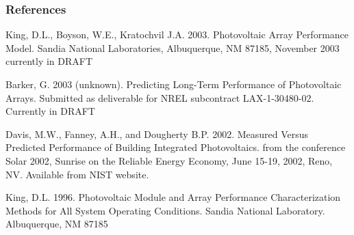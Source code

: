 \subsubsection{References}\label{references-1-014}

King, D.L., Boyson, W.E., Kratochvil J.A. 2003. Photovoltaic Array Performance Model. Sandia National Laboratories, Albuquerque, NM 87185, November 2003~ currently in DRAFT

Barker, G. 2003 (unknown). Predicting Long-Term Performance of Photovoltaic Arrays. Submitted as deliverable for NREL subcontract LAX-1-30480-02. Currently in DRAFT

Davis, M.W., Fanney, A.H., and Dougherty B.P. 2002. Measured Versus Predicted Performance of Building Integrated Photovoltaics. from the conference Solar 2002, Sunrise on the Reliable Energy Economy, June 15-19, 2002, Reno, NV. Available from NIST website.

King, D.L. 1996. Photovoltaic Module and Array Performance Characterization Methods for All System Operating Conditions. Sandia National Laboratory. Albuquerque, NM 87185
